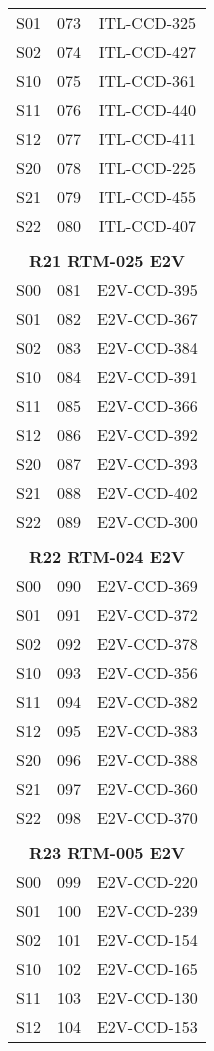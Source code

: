 \begin{longtable}{ccc}
  S01 & 073 & ITL-CCD-325 \\
  S02 & 074 & ITL-CCD-427 \\
  S10 & 075 & ITL-CCD-361 \\
  S11 & 076 & ITL-CCD-440 \\
  S12 & 077 & ITL-CCD-411 \\
  S20 & 078 & ITL-CCD-225 \\
  S21 & 079 & ITL-CCD-455 \\
  S22 & 080 & ITL-CCD-407 \\
 & & \\
\multicolumn{3}{c}{\bf R21  RTM-025  E2V} \\
\hline
  S00 & 081 & E2V-CCD-395 \\
  S01 & 082 & E2V-CCD-367 \\
  S02 & 083 & E2V-CCD-384 \\
  S10 & 084 & E2V-CCD-391 \\
  S11 & 085 & E2V-CCD-366 \\
  S12 & 086 & E2V-CCD-392 \\
  S20 & 087 & E2V-CCD-393 \\
  S21 & 088 & E2V-CCD-402 \\
  S22 & 089 & E2V-CCD-300 \\
 & & \\
\multicolumn{3}{c}{\bf R22  RTM-024  E2V} \\
\hline
  S00 & 090 & E2V-CCD-369 \\
  S01 & 091 & E2V-CCD-372 \\
  S02 & 092 & E2V-CCD-378 \\
  S10 & 093 & E2V-CCD-356 \\
  S11 & 094 & E2V-CCD-382 \\
  S12 & 095 & E2V-CCD-383 \\
  S20 & 096 & E2V-CCD-388 \\
  S21 & 097 & E2V-CCD-360 \\
  S22 & 098 & E2V-CCD-370 \\
 & & \\
\multicolumn{3}{c}{\bf R23  RTM-005  E2V} \\
\hline
  S00 & 099 & E2V-CCD-220 \\
  S01 & 100 & E2V-CCD-239 \\
  S02 & 101 & E2V-CCD-154 \\
  S10 & 102 & E2V-CCD-165 \\
  S11 & 103 & E2V-CCD-130 \\
  S12 & 104 & E2V-CCD-153 \\

\end{longtable}
